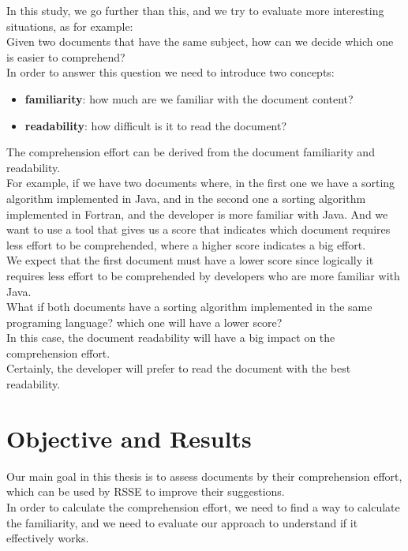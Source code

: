 \documentclass[mscthesis,20pt]{usiinfthesis}
\begin{document}
	In this study, we go further than this, and we try to evaluate more interesting situations, as for example:\\
	Given two documents that have the same subject, how can we decide which one is easier to comprehend?\\
	In order to answer this question we need to introduce two concepts:
	\begin{itemize}
	\item \textbf{familiarity}: how much are we familiar with the document content?
	\item \textbf{readability}: how difficult is it to read the document?
	\end{itemize}
	The comprehension effort can be derived from the document familiarity and readability.\\

	For example, if we have two documents where, in the first one we have a sorting algorithm implemented in Java, and in the second one a sorting algorithm implemented in Fortran, and the developer is more familiar with Java. And we want to use a tool that gives us a score that indicates which document requires less effort to be comprehended, where a higher score indicates a big effort.\\
	We expect that the first document must have a lower score since logically it requires less effort to be comprehended by developers who are more familiar with Java.\\
	What if both documents have a sorting algorithm implemented in the same programing language? which one will have a lower score? \\
	In this case, the document readability will have a big impact on the comprehension effort.\\
	Certainly, the developer will prefer to read the document with the best readability.\\
	
	\section{Objective and Results}
	Our main goal in this thesis is to assess documents by their comprehension effort, which can be used by RSSE to improve their suggestions.\\
	In order to calculate the comprehension effort, we need to find a way to calculate the familiarity, and we need to evaluate our approach to understand if it effectively works.\\
\end{document}
